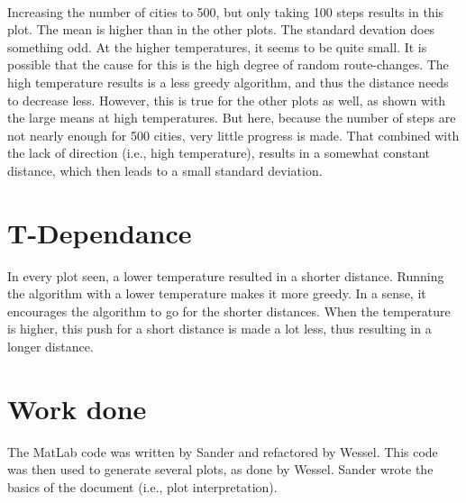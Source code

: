 \documentclass[10pt,a4paper]{article}
\begin{document}
 \\
Increasing the number of cities to 500, but only taking 100 steps results in this plot. The mean is higher than in the other plots. The standard devation does something odd. At the higher temperatures, it seems to be quite small. It is possible that the cause for this is the high degree of random route-changes. The high temperature results is a less greedy algorithm, and thus the distance needs to decrease less. However, this is true for the other plots as well, as shown with the large means at high temperatures. But here, because the number of steps are not nearly enough for 500 cities, very little progress is made. That combined with the lack of direction (i.e., high temperature), results in a somewhat constant distance, which then leads to a small standard deviation.

\section{T-Dependance}
In every plot seen, a lower temperature resulted in a shorter distance. Running the algorithm with a lower temperature makes it more greedy. In a sense, it encourages the algorithm to go for the shorter distances. When the temperature is higher, this push for a short distance is made a lot less, thus resulting in a longer distance.

\section{Work done}
The MatLab code was written by Sander and refactored by Wessel. 
This code was then used to generate several plots, as done by Wessel. Sander wrote the basics of the document (i.e., plot interpretation).
\end{document}
